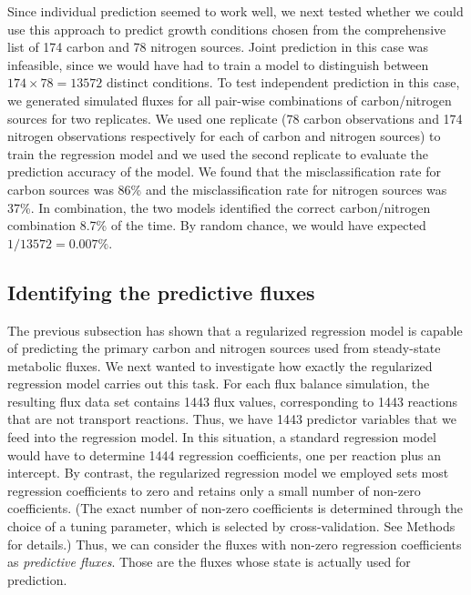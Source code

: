 \documentclass[12pt]{article}
\begin{document}
Since individual prediction seemed to work well, we next tested whether we could use this approach to predict growth conditions chosen from the comprehensive list of 174 carbon and 78 nitrogen sources. Joint prediction in this case was infeasible, since we would have had to train a model to distinguish between $174\times78=13572$ distinct conditions. To test independent prediction in this case, we generated simulated fluxes for all pair-wise combinations of carbon/nitrogen sources for two replicates. We used one replicate (78 carbon observations and 174 nitrogen observations respectively for each of carbon and nitrogen sources) to train the regression model and we used the second replicate to evaluate the prediction accuracy of the model. We found that the misclassification rate for carbon sources was 86\% and the misclassification rate for nitrogen sources was 37\%. In combination, the two models identified the correct carbon/nitrogen combination 8.7\% of the time. By random chance, we would have expected $1/13572=0.007\%$.


\subsection*{Identifying the predictive fluxes}

The previous subsection has shown that a regularized regression model is capable of predicting the primary carbon and nitrogen sources used from steady-state metabolic fluxes. We next wanted to investigate how exactly the regularized regression model carries out this task. For each flux balance simulation, the resulting flux data set contains 1443 flux values, corresponding to 1443 reactions that are not transport reactions. Thus, we have 1443 predictor variables that we feed into the regression model. In this situation, a standard regression model would have to determine 1444 regression coefficients, one per reaction plus an intercept. By contrast, the regularized regression model we employed sets most regression coefficients to zero and retains only a small number of non-zero coefficients. (The exact number of non-zero coefficients is determined through the choice of a tuning parameter, which is selected by cross-validation. See Methods for details.) Thus, we can consider the fluxes with non-zero regression coefficients as \emph{predictive fluxes}. Those are the fluxes whose state is actually used for prediction.
\end{document}
